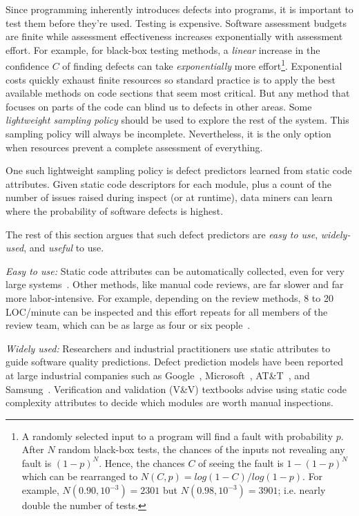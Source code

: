 Since programming inherently
introduces defects into  programs, it is important to test them before they're used.
Testing is expensive.
Software assessment budgets are finite
while assessment effectiveness increases 
exponentially with assessment effort.
For example, for  black-box testing methods,
a {\em linear} increase
in the confidence $C$ of finding  defects
can take {\em exponentially} more effort\footnote{A randomly selected 
input to a program will find a fault with probability $p$.
After $N$ random black-box tests, the chances of the inputs 
not revealing any fault 
is $(1-p)^N$. Hence, the chances $C$ of seeing the fault is $1-(1-p)^N$
which can be rearranged to 
 $N(C,p)=log(1 -
C)/log(1-p)$. For example, $N(0.90,10^{-3})=2301$
but $N(0.98,10^{-3})=3901$; i.e. nearly double the number of tests.}.
Exponential costs quickly exhaust finite resources so
standard practice is to apply the best
available  methods on code sections that seem   most critical. 
But 
any method that focuses on parts of the code
can blind us to defects in other areas. Some  {\em
lightweight sampling policy} should be used to explore the rest of the system.  This
sampling policy will always be incomplete.
Nevertheless, it is the only option when
resources prevent a complete assessment of everything.

One such lightweight sampling policy is defect predictors learned from static code attributes.
Given static code descriptors for each module, plus a count of the number of issues raised during inspect (or at runtime),
data miners can
learn where the probability of software defects is highest.



The rest of this section argues that such defect predictors are   {\em easy to
use}, {\em widely-used}, and {\em useful} to use.

{\em Easy to use:} Static code attributes can be automatically collected, even for very large systems~\cite{nagappan05}.
Other methods, like  manual code reviews, are far slower and far more labor-intensive.
For example, depending on the review methods, 8 to 20 LOC/minute can be
inspected and this effort repeats for all members of the review team,
which can be as large as four or six people~\cite{me02f}. 

{\em Widely used:}  Researchers and industrial practitioners  use static attributes to guide software 
quality predictions.
 Defect prediction models have been reported
  at large industrial companies such as Google~\cite{lewis13}, Microsoft~\cite{Nagappan06}, AT\&T~\cite{Ostrand05}, and Samsung~\cite{Kim15remi}.
Verification and validation (V\&V) textbooks
\cite{rakitin01} advise using static code complexity attributes
to decide which modules are worth manual inspections. 


